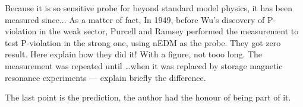 Because it is so sensitive probe for beyond standard model physics, it has been measured since... As a matter of fact, In 1949, before Wu's discovery of P-violation in the weak sector, Purcell and Ramsey performed the measurement to test P-violation in the strong one, using nEDM as the probe. They got zero result. Here explain how they did it! With a figure, not tooo long. The measurement was repeated until \ldots when it was replaced by storage magnetic resonance experiments --- explain briefly the difference.

The last point is the prediction, the author had the honour of being part of it.

